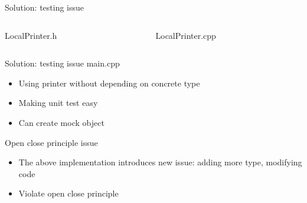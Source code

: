 \documentclass[13pt]{beamer}
\begin{document}
\begin{frame}{Solution: testing issue}
\begin{columns}[T]
	\begin{column}{.45\textwidth}
		LocalPrinter.h
		\lstset{basicstyle=\tiny,style=myCustomCppStyle}
		
	\end{column}
	
	\begin{column}{.45\textwidth}
		LocalPrinter.cpp
		\lstset{basicstyle=\tiny,style=myCustomCppStyle}
		
	\end{column}
\end{columns}
\end{frame}

\begin{frame}{Solution: testing issue}
	main.cpp
	\lstset{basicstyle=\tiny,style=myCustomCppStyle}
	
	\begin{itemize}
		\setlength\itemsep{1em}
		\item Using printer without depending on concrete type
		\item Making unit test easy
		\item Can create mock object
	\end{itemize}
\end{frame}

\begin{frame}{Open close principle issue}
	\begin{itemize}
		\setlength\itemsep{1em}
		\item The above implementation introduces new issue: adding more type, modifying code
		\item Violate open close principle
	\end{itemize}
\end{frame}
\end{document}
